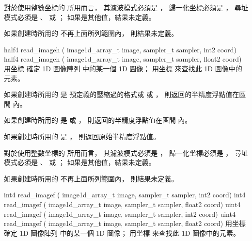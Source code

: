 對於使用整數坐標的  所用而言，
其濾波模式必須是 ，
歸一化坐標必須是 ，
尋址模式必須是 、 
 或 ；
如果是其他值，結果未定義。

如果創建時所用的  不再上面所列範圍內，
則結果未定義。
\stopbuffer

half4 read_imageh (
	image1d_array_t image,
	sampler_t sampler,
	int2 coord)
half4 read_imageh (
	image1d_array_t image,
	sampler_t sampler,
	float2 coord)
\stopbuffer
{}
用坐標  確定 1D 圖像陣列  中的某一個 1D 圖像；
用坐標  來查找此 1D 圖像中的元素。

如果創建時所用的  是
預定義的壓縮過的格式或  或 ，
則返回的半精度浮點值在區間 \math{[0.0 \cdots 1.0]} 內。

如果創建時所用的  是
  或 ，
則返回的半精度浮點值在區間 \math{[-1.0 \cdots 1.0]} 內。

如果創建時所用的  是 ，
則返回原始半精度浮點值。

對於使用整數坐標的  所用而言，
其濾波模式必須是 ，
歸一化坐標必須是 ，
尋址模式必須是 、 
 或 ；
如果是其他值，結果未定義。

如果創建時所用的  不再上面所列範圍內，
則結果未定義。
\stopbuffer

int4 read_imagef (
	image1d_array_t image,
	sampler_t sampler,
	int2 coord)
int4 read_imagef (
	image1d_array_t image,
	sampler_t sampler,
	float2 coord)
uint4 read_imagef (
	image1d_array_t image,
	sampler_t sampler,
	int2 coord)
uint4 read_imagef (
	image1d_array_t image,
	sampler_t sampler,
	float2 coord)
\stopbuffer
{}
用坐標  確定 1D 圖像陣列  中的某一個 1D 圖像；
用坐標  來查找此 1D 圖像中的元素。

